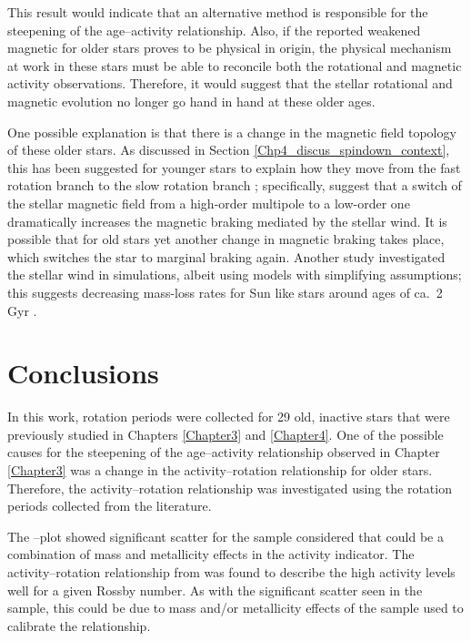 This result would indicate that an alternative method is responsible for the steepening of the age--activity relationship. Also, if the reported weakened magnetic for older stars \citep{van_Saders_etal_2016} proves to be physical in origin, the physical mechanism at work in these stars must be able to reconcile both the rotational and magnetic activity \citep{Booth_etal_2017} observations. Therefore, it would suggest that the stellar rotational and magnetic evolution no longer go hand in hand at these older ages.

One possible explanation is that there is a change in the magnetic field topology of these older stars. As discussed in Section \ref{Chp4_discus_spindown_context}, this has been suggested for younger stars to explain how they move from the fast rotation branch to the slow rotation branch \citep{Garraffo_etal_2015, Garraffo_etal_2018}; specifically, \citet{Garraffo_etal_2016} suggest that a switch of the stellar magnetic field from a high-order multipole to a low-order one dramatically increases the magnetic braking mediated by the stellar wind. It is possible that for old stars yet another change in magnetic braking takes place, which switches the star to marginal braking again. Another study investigated the stellar wind in simulations, albeit using models with simplifying assumptions; this suggests decreasing mass-loss rates for Sun like stars around ages of ca.\ 2\,Gyr \citep{OFionnagain_Vidotto_2018}.


\section{Conclusions}
In this work, rotation periods were collected for 29 old, inactive stars that were previously studied in Chapters \ref{Chapter3} and \ref{Chapter4}. One of the possible causes for the steepening of the age--activity relationship observed in Chapter \ref{Chapter3} was a change in the activity--rotation relationship for older stars. Therefore, the activity--rotation relationship was investigated using the rotation periods collected from the literature.

The \Rprime--\Ro plot showed significant scatter  for the sample considered that could be a combination of mass and metallicity effects in the \Rprime activity indicator. The activity--rotation relationship from \citet{Mamajek_Hillenbrand_2008} was found to describe the high activity levels well for a given Rossby number. As with the significant scatter seen in the sample, this could be due to mass and/or metallicity effects of the sample used to calibrate the relationship.

